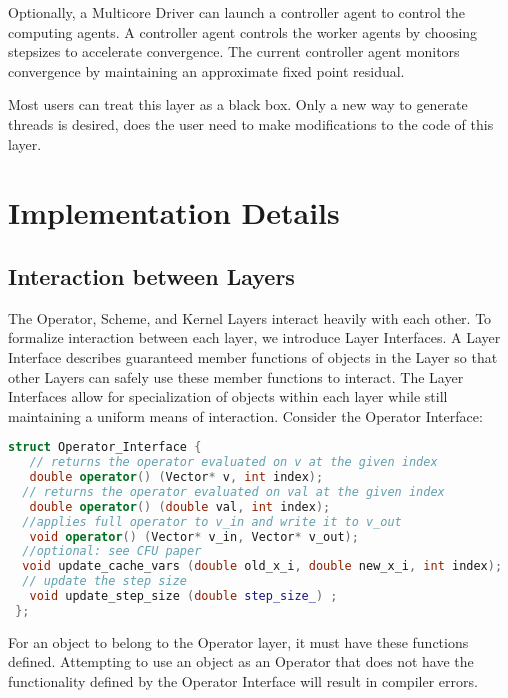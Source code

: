 Optionally, a Multicore Driver can launch a controller agent to control the computing agents.
A controller agent controls the worker agents by choosing stepsizes to accelerate convergence.
The current controller agent monitors convergence by maintaining an approximate fixed point residual.

Most users can treat this layer as a black box. Only a new way to generate threads is desired, does the user need to make modifications to the code of this layer.

\section{Implementation Details}

\subsection{Interaction between Layers}

The Operator, Scheme, and Kernel Layers interact heavily with each other. To formalize interaction between each layer, we introduce Layer Interfaces. A Layer Interface describes guaranteed member functions of objects in the Layer so that other Layers can safely use these member functions to interact. The Layer Interfaces allow for specialization of objects within each layer while still maintaining a uniform means of interaction. Consider the Operator Interface:
\begin{lstlisting}[language=C++,label={Operator_Interface}]
struct Operator_Interface {
   // returns the operator evaluated on v at the given index
   double operator() (Vector* v, int index);
  // returns the operator evaluated on val at the given index
   double operator() (double val, int index);
  //applies full operator to v_in and write it to v_out
   void operator() (Vector* v_in, Vector* v_out);
  //optional: see CFU paper
  void update_cache_vars (double old_x_i, double new_x_i, int index);
  // update the step size
   void update_step_size (double step_size_) ;
 };
\end{lstlisting}

For an object to belong to the Operator layer, it must have these functions defined.
Attempting to use an object as an Operator that does not have the functionality defined by the Operator Interface will result in compiler errors.

